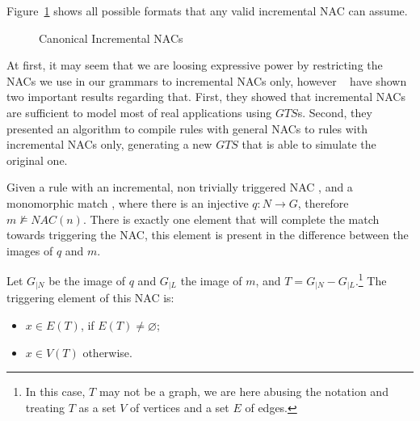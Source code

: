\begin{example}Figure~\ref{fig:process:incremental-nacs} shows all possible formats that any valid incremental NAC can assume.

\begin{figure}[!ht]
  \centering
  \caption{Canonical Incremental NACs}\label{fig:process:incremental-nacs}
\end{figure}
\end{example}

At first, it may seem that we are loosing expressive power by restricting the NACs we use in our grammars to incremental NACs only, however ~\cite{Corradini2013} have shown two important results regarding that. First, they showed that incremental NACs are sufficient to model most of real applications using $GTS$s. Second, they presented an algorithm to compile rules with general NACs to rules with incremental NACs only, generating a new $GTS$ that is able to simulate the original one.

\begin{definition} Given a rule \graphrule{} with an incremental, non trivially triggered NAC \nac{}, and a monomorphic match \match{}, where there is an injective $q : N \rightarrow G$, therefore $m \not\models NAC(n)$. There is exactly one element that will complete the match towards triggering the NAC, this element is present in the difference between the images of $q$ and $m$.

  Let $G_{|N}$ be the image of $q$ and $G_{|L}$ the image of $m$, and \mbox{$T = G_{|N} - G_{|L}$}.\footnote{In this case, $T$ may not be a graph, we are here abusing the notation and treating $T$ as a set $V$ of vertices and a set $E$ of edges.} The triggering element of this NAC is:

  \begin{itemize}
    \item $x \in E(T)$, if $E(T) \neq \varnothing$;
    \item $x \in V(T)$ otherwise.
  \end{itemize} 
\end{definition}

